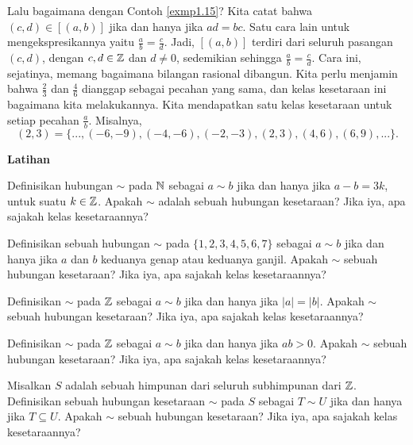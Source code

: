 \begin{exmp}
Lalu bagaimana dengan Contoh \ref{exmp1.15}? Kita catat bahwa $(c,d) \in [(a,b)]$ jika dan hanya jika $ad = bc$. Satu cara lain untuk mengekspresikannya yaitu $\frac{a}{b} = \frac{c}{d}$. Jadi, $[(a,b)]$ terdiri dari seluruh pasangan $(c,d)$, dengan $c, d \in \mathbb{Z}$ dan $d \neq 0$, sedemikian sehingga $\frac{a}{b} = \frac{c}{d}$. Cara ini, sejatinya, memang bagaimana bilangan rasional dibangun. Kita perlu menjamin bahwa $\frac{2}{3}$ dan $\frac{4}{6}$ dianggap sebagai pecahan yang sama, dan kelas kesetaraan ini bagaimana kita melakukannya. Kita mendapatkan satu kelas kesetaraan untuk setiap pecahan $\frac{a}{b}$. Misalnya,
\[ (2,3) = \{ ..., (-6, -9), (-4, -6), (-2, -3), (2, 3), (4,6), (6, 9), ...\}.
\]
\end{exmp}
\hfill \break


\textbf{Latihan}

\begin{exc}
Definisikan hubungan $\sim$ pada $\mathbb{N}$ sebagai $a \sim b$ jika dan hanya jika $a - b = 3k$, untuk suatu $k \in \mathbb{Z}$. Apakah $\sim$ adalah sebuah hubungan kesetaraan? Jika iya, apa sajakah kelas kesetaraannya?
\end{exc}

\begin{exc}
Definisikan sebuah hubungan $\sim$ pada $\{1, 2, 3, 4, 5, 6, 7\}$ sebagai $a \sim b$ jika dan hanya jika $a$ dan $b$ keduanya genap atau keduanya ganjil. Apakah $\sim$ sebuah hubungan kesetaraan? Jika iya, apa sajakah kelas kesetaraannya?
\end{exc}

\begin{exc}
Definisikan $\sim$ pada $\mathbb{Z}$ sebagai $a \sim b$ jika dan hanya jika $|a| = |b|$. Apakah $\sim$ sebuah hubungan kesetaraan? Jika iya, apa sajakah kelas kesetaraannya?
\end{exc}

\begin{exc}
Definisikan $\sim$ pada $\mathbb{Z}$ sebagai $a \sim b$ jika dan hanya jika $ab>0$. Apakah $\sim$ sebuah hubungan kesetaraan? Jika iya, apa sajakah kelas kesetaraannya?
\end{exc}

\begin{exc}
Misalkan $S$ adalah sebuah himpunan dari seluruh subhimpunan dari $\mathbb{Z}$. Definisikan sebuah hubungan kesetaraan $\sim$ pada $S$ sebagai $T \sim U$ jika dan hanya jika $T \subseteq U$. Apakah $\sim$ sebuah hubungan kesetaraan? Jika iya, apa sajakah kelas kesetaraannya?
\end{exc}

